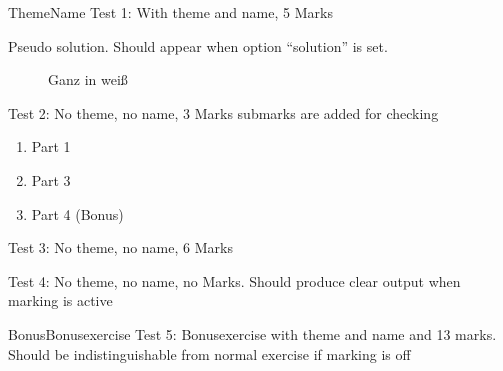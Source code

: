 \documentclass[pdftex,final,formula,logo,german]{hofuniversity}
\begin{document}
\begin{exercise}{5}{Theme}{Name}
  Test 1: With theme and name, 5 Marks
  \begin{solution}
    Pseudo solution. Should appear when option ``solution'' is set.
  \end{solution}
\end{exercise}

\begin{figure}[ht]
  \centering
  \vspace*{3cm}
  \caption{Ganz in weiß}
  \label{fig:test}
\end{figure}

\begin{exercise}{3}{}{}
  Test 2: No theme, no name, 3 Marks submarks are added for checking
  \begin{enumerate}
  \item Part 1 
  \item Part 3 
  \item Part 4 (Bonus) 
  \end{enumerate}
\end{exercise}

\begin{exercise}{6}{}{}
  Test 3: No theme, no name, 6 Marks
\end{exercise}

\begin{exercise}{}{}{}
  Test 4: No theme, no name, no Marks. Should produce clear output
  when marking is active
\end{exercise}

\begin{bonusexercise}{13}{Bonus}{Bonusexercise}
  Test 5: Bonusexercise with theme and name and 13 marks. Should be
  indistinguishable from normal exercise if marking is off
\end{bonusexercise}
\end{document}
